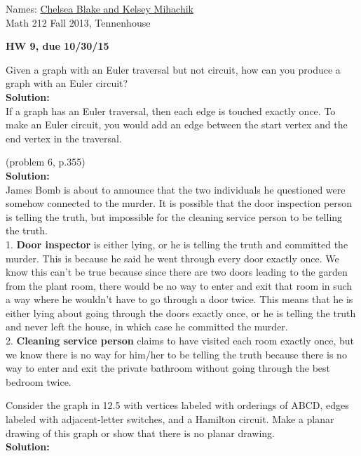 \documentclass[12pt,letterpaper]{exam}
\begin{document}
\setlength{\pdfpageheight}{\paperheight}
\setlength{\pdfpagewidth}{\paperwidth}

\newcommand{\ud}{\,\mathrm{d}}
\pointsinmargin

Names: \underline{Chelsea Blake and Kelsey Mihachik \hspace{2in}}\\
Math 212 Fall 2013, Tennenhouse \\


\begin{center}
\textbf{HW 9, due 10/30/15}\\
\end{center}


\begin{questions}


\question[12,2]
Given a graph with an Euler traversal but not circuit, how can you produce a graph with an Euler circuit?\\
\textbf{Solution:}\\
If a graph has an Euler traversal, then each edge is touched exactly once. To make an Euler circuit, you would add an edge between the start vertex and the end vertex in the traversal.

\question[12,6]
(problem 6, p.355)\\
\textbf{Solution:}\\
James Bomb is about to announce that the two individuals he questioned were somehow connected to the murder. It is possible that the door inspection person is telling the truth, but impossible for the cleaning service person to be telling the truth.\\
1. \textbf{Door inspector} is either lying, or he is telling the truth and committed the murder. This is because he said he went through every door exactly once. We know this can't be true because since there are two doors leading to the garden from the plant room, there would be no way to enter and exit that room in such a way where he wouldn't have to go through a door twice. This means that he is either lying about going through the doors exactly once, or he is telling the truth and never left the house, in which case he committed the murder.\\
2. \textbf{Cleaning service person} claims to have visited each room exactly once, but we know there is no way for him/her to be telling the truth because there is no way to enter and exit the private bathroom without going through the best bedroom twice.

\question[12,9]
Consider the graph in 12.5 with vertices labeled with orderings of ABCD, edges labeled with adjacent-letter switches, and a Hamilton circuit. Make a planar drawing of this graph or show that there is no planar drawing.
\\
\textbf{Solution:}
\\


\end{questions}
\end{document}
